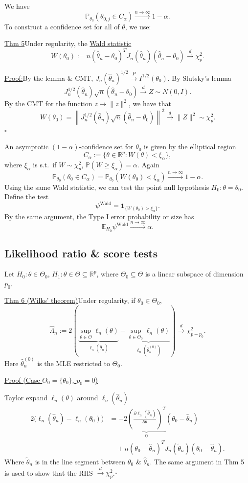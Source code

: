 \documentclass[11pt,a4paper]{article}
\begin{document}
We have
\[
\mathbb P_{\theta_0}(\theta_{0,j}\in C_\alpha)
\xrightarrow{n\to\infty}1-\alpha.
\]
To construct a confidence set for all of $\theta$, we use:

\medskip
\noindent\underline{Thm 5}\quad Under regularity, the \underline{Wald statistic}
\[
W(\theta_0):=n(\hat\theta_n-\theta_0)^T
J_n(\hat\theta_n)(\hat\theta_n-\theta_0)
\xrightarrow{d}\chi_p^2.
\]

\noindent\underline{Proof:}\quad By the lemma \& CMT,
$J_n(\hat\theta_n)^{1/2}\xrightarrow{P}I^{1/2}(\theta_0)$.
By Slutsky's lemma
\[
J_n^{1/2}(\hat\theta_n)\sqrt n(\hat\theta_n-\theta_0)
\xrightarrow{d}Z\sim N(0,I).
\]
By the CMT for the function $z\mapsto\|z\|^2$, we have that
\[
W(\theta_0)=\left\|J_n^{1/2}(\hat\theta_n)
\sqrt n(\hat\theta_n-\theta_0)\right\|^2
\xrightarrow{d}\|Z\|^2\sim\chi_p^2.
\]
\hfill$\square$

An asymptotic $(1-\alpha)$-confidence set for $\theta_0$ is given by the elliptical region
\[
C_\alpha:=\{\theta\in\mathbb R^p:W(\theta)<\xi_\alpha\},
\]
where $\xi_\alpha$ is s.t.\ if $W\sim\chi_p^2$,
$\mathbb P(W\geq\xi_\alpha)=\alpha$.
Again
\[
\mathbb P_{\theta_0}(\theta_0\in C_\alpha)
=\mathbb P_{\theta_0}(W(\theta_0)<\xi_\alpha)
\xrightarrow{n\to\infty}1-\alpha.
\]
Using the same Wald statistic, we can test the point null hypothesis
$H_0:\theta=\theta_0$.
Define the test
\[
\psi^{\mathrm{Wald}}=\mathbf1_{\{W(\theta_0)>\xi_\alpha\}}.
\]
By the same argument, the Type I error probability or size has
\[
\mathbb E_{H_0}\psi^{\mathrm{Wald}}\xrightarrow{n\to\infty}\alpha.
\]

\subsection*{Likelihood ratio \& score tests}

Let $H_0:\theta\in\Theta_0$, $H_1:\theta\in\Theta\subseteq\mathbb R^p$,
where $\Theta_0\subseteq\Theta$ is a linear subspace of dimension $p_0$.

\medskip
\noindent\underline{Thm 6 (Wilks' theorem)}\quad Under regularity, if $\theta_0\in\Theta_0$,
\[
\hat\Lambda_n:=2\left(
\underbrace{\sup_{\theta\in\Theta}\ell_n(\theta)}_{\ell_n(\hat\theta_n)}
-\underbrace{\sup_{\theta\in\Theta_0}\ell_n(\theta)}_{\ell_n(\hat\theta_n^{(0)})}
\right)\xrightarrow{d}\chi_{p-p_0}^2.
\]
Here $\hat\theta_n^{(0)}$ is the MLE restricted to $\Theta_0$.

\noindent\underline{Proof (Case $\Theta_0=\{\theta_0\}$, $p_0=0$)}

Taylor expand $\ell_n(\theta)$ around $\ell_n(\hat\theta_n)$
\[
\begin{aligned}
2\bigl(\ell_n(\hat\theta_n)-\ell_n(\theta_0)\bigr)
&=-2\underbrace{\left(\frac{\partial\ell_n(\hat\theta_n)}{\partial\theta}\right)^T}_{0}
(\theta_0-\hat\theta_n)\\
&\quad+n(\theta_0-\hat\theta_n)^T
J_n(\tilde\theta_n)(\theta_0-\hat\theta_n).
\end{aligned}
\]
Where $\tilde\theta_n$ is in the line segment between $\theta_0$ \& $\hat\theta_n$.
The same argument in Thm 5 is used to show that the RHS
$\xrightarrow{d}\chi_p^2$.\hfill$\square$
\end{document}

